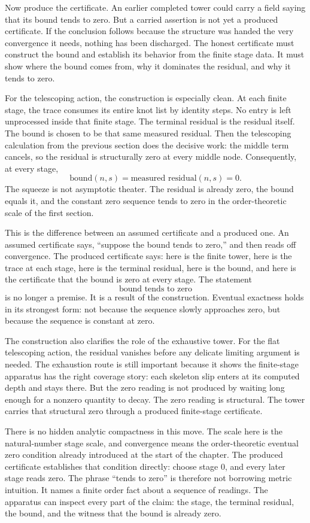 Now produce the certificate. An earlier completed tower could carry a field
saying that its bound tends to zero. But a carried assertion is not yet a
produced certificate. If the conclusion follows because the structure was handed
the very convergence it needs, nothing has been discharged. The honest
certificate must construct the bound and establish its behavior from the finite
stage data. It must show where the bound comes from, why it dominates the
residual, and why it tends to zero.

For the telescoping action, the construction is especially clean. At each finite
stage, the trace consumes its entire knot list by identity steps. No entry is
left unprocessed inside that finite stage. The terminal residual is the residual
itself. The bound is chosen to be that same measured residual. Then the
telescoping calculation from the previous section does the decisive work: the
middle term cancels, so the residual is structurally zero at every middle node.
Consequently, at every stage,
\[
  \text{bound}(n,s)=\text{measured residual}(n,s)=0.
\]
The squeeze is not asymptotic theater. The residual is already zero, the bound
equals it, and the constant zero sequence tends to zero in the order-theoretic
scale of the first section.

This is the difference between an assumed certificate and a produced one. An
assumed certificate says, ``suppose the bound tends to zero,'' and then reads
off convergence. The produced certificate says: here is the finite tower, here
is the trace at each stage, here is the terminal residual, here is the bound,
and here is the certificate that the bound is zero at every stage. The statement
\[
  \text{bound tends to zero}
\]
is no longer a premise. It is a result of the construction. Eventual exactness
holds in its strongest form: not because the sequence slowly approaches zero,
but because the sequence is constant at zero.

The construction also clarifies the role of the exhaustive tower. For the flat
telescoping action, the residual vanishes before any delicate limiting argument
is needed. The exhaustion route is still important because it shows the
finite-stage apparatus has the right coverage story: each skeleton slip enters
at its computed depth and stays there. But the zero reading is not produced by
waiting long enough for a nonzero quantity to decay. The zero reading is
structural. The tower carries that structural zero through a produced
finite-stage certificate.

There is no hidden analytic compactness in this move. The scale here is the
natural-number stage scale, and convergence means the order-theoretic eventual
zero condition already introduced at the start of the chapter. The produced
certificate establishes that condition directly: choose stage \(0\), and every later
stage reads zero. The phrase ``tends to zero'' is therefore not borrowing metric
intuition. It names a finite order fact about a sequence of readings. The
apparatus can inspect every part of the claim: the stage, the terminal
residual, the bound, and the witness that the bound is already zero.


